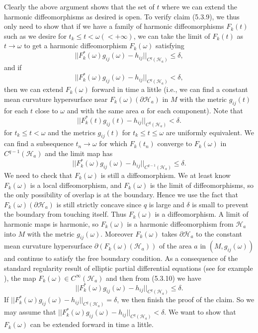 Clearly the above argument shows that the set of $t$ where we can
extend the harmonic diffeomorphisms as desired is open. To verify
claim (5.3.9), we thus only need to show that if we have a family
of harmonic diffeomorphisms $F_k(t)$ such as we desire for $t_k\le
t<\omega (<+\infty)$, we can take the limit of $F_k(t)$ as
$t\rightarrow \omega$ to get a harmonic diffeomorphism
$F_k(\omega)$ satisfying
$$
||F^*_k(\omega)g_{ij}(\omega)-h_{ij}||_{C^q(\mathcal{H}_a)}\le\delta,
$$
and if
$$
||F^*_k(\omega)g_{ij}(\omega)-h_{ij}||_{C^q(\mathcal{H}_a)} <
\delta,
$$
then we can extend $F_k(\omega)$ forward in time a little (i.e.,
we can find a constant mean curvature hypersurface near
$F_k(\omega)(\partial \mathcal{H}_a)$ in $M$ with the metric
$g_{ij}(t)$ for each $t$ close to $\omega$ and with the same area
$a$ for each component). Note that \begin{equation}
||F^*_k(t)g_{ij}(t)-h_{ij}||_{C^q(\mathcal{H}_a)}<\delta.
\end{equation} for $t_k\le t<\omega$ and the metrics $g_{ij}(t)$ for $t_k\le
t\le\omega$ are uniformly equivalent. We can find a subsequence
$t_n\rightarrow \omega$ for which $F_k(t_n)$ converge to
$F_k(\omega)$ in $C^{q-1}(\mathcal{H}_a)$ and the limit map has
$$
||F^*_k(\omega)g_{ij}(\omega)-h_{ij}||_{C^{q-1}(\mathcal{H}_a)}
\le\delta.
$$
We need to check that $F_k(\omega)$ is still a diffeomorphism. We
at least know $F_k(\omega)$ is a local diffeomorphism, and
$F_k(\omega)$ is the limit of diffeomorphisms, so the only
possibility of overlap is at the boundary. Hence we use the fact
that $F_k(\omega)(\partial\mathcal{H}_a)$ is still strictly
concave since $q$ is large and $\delta$ is small to prevent the
boundary from touching itself. Thus $F_k(\omega)$ is a
diffeomorphism. A limit of harmonic maps is harmonic, so
$F_k(\omega)$ is a harmonic diffeomorphism from $\mathcal{H}_a$
into $M$ with the metric $g_{ij}(\omega)$. Moreover $F_k(\omega)$
takes $\partial\mathcal{H}_a$ to the constant mean curvature
hypersurface $\partial (F_k(\omega)(\mathcal{H}_a))$ of the area
$a$ in $(M,g_{ij}(\omega))$ and continue to satisfy the free
boundary condition. As a consequence of the standard regularity
result of elliptic partial differential equations (see for example
\cite{GT}), the map $F_k(\omega)\in C^\infty(\mathcal{H}_a)$ and
then from (5.3.10) we have
$$
||F^*_k(\omega)g_{ij}(\omega)-h_{ij}||_{C^q(\mathcal{H}_a)}\le\delta.
$$
If
$||F^*_k(\omega)g_{ij}(\omega)-h_{ij}||_{C^q(\mathcal{H}_a)}=\delta$,
we then finish the proof of the claim. So we may assume that
$||F^*_k(\omega)g_{ij}(\omega)-h_{ij}||_{C^q(\mathcal{H}_a)}<\delta$.
We want to show that $F_k(\omega)$ can be extended forward in time
a little.

